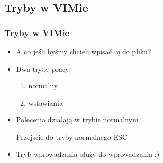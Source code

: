 \documentclass[10pt]{beamer}
\begin{document}
\subsection{Tryby w VIMie}
\begin{frame}
	\frametitle{Tryby w VIMie}
	\begin{itemize}[<+->]
		\item A co jeśli byśmy chcieli wpisać \textit{:q} do pliku?
		\item Dwa tryby pracy:
			\begin{enumerate}
			\item normalny
			\item wstawiania
			\end{enumerate}
		\item Polecenia działają w trybie normalnym
		\begin{block}{Przejscie do tryby normalnego}
			ESC
		\end{block}
		\item Tryb wprowadzania służy do wprowadzania :)
	\end{itemize}
\end{frame}
\end{document}
